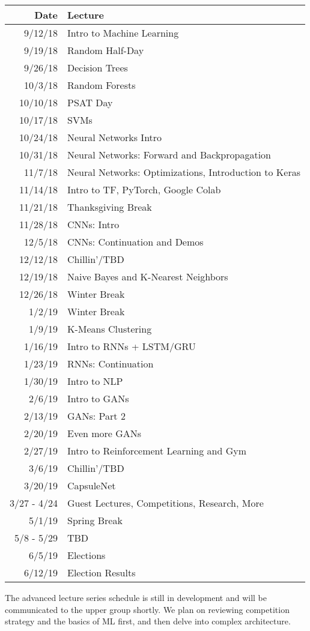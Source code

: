 \documentclass{article}
\begin{document}
\begin{tabular}{|r|l| }
  \hline
\textbf{Date} & \textbf{Lecture} \\
  \hline
9/12/18 & Intro to Machine Learning \\ 
9/19/18 & Random Half-Day \\ 
9/26/18 & Decision Trees \\ 
10/3/18 & Random Forests \\ 
10/10/18 & PSAT Day \\ 
10/17/18 & SVMs \\ 
10/24/18 & Neural Networks Intro \\ 
10/31/18 & Neural Networks: Forward and Backpropagation \\ 
11/7/18 & Neural Networks: Optimizations, Introduction to Keras \\ 
11/14/18 & Intro to TF, PyTorch, Google Colab \\ 
11/21/18 & Thanksgiving Break \\ 
11/28/18 & CNNs: Intro \\ 
12/5/18 & CNNs: Continuation and Demos \\ 
12/12/18 & Chillin'/TBD \\ 
12/19/18 & Naive Bayes and K-Nearest Neighbors \\ 
12/26/18 & Winter Break \\ 
1/2/19 & Winter Break \\ 
1/9/19 & K-Means Clustering \\ 
1/16/19 & Intro to RNNs + LSTM/GRU \\ 
1/23/19 & RNNs: Continuation \\ 
1/30/19 & Intro to NLP \\ 
2/6/19 & Intro to GANs \\ 
2/13/19 & GANs: Part 2 \\ 
2/20/19 & Even more GANs \\ 
2/27/19 & Intro to Reinforcement Learning and Gym \\ 
3/6/19 & Chillin'/TBD \\ 
3/20/19 & CapsuleNet \\ 
3/27 - 4/24 & Guest Lectures, Competitions, Research, More \\
5/1/19  & Spring Break \\ 
5/8 - 5/29 & TBD \\
6/5/19 & Elections \\
6/12/19 & Election Results \\
  \hline
\end{tabular}
\newline
The advanced lecture series schedule is still in development and will be communicated to the upper group shortly. We plan on reviewing competition strategy and the basics of ML first, and then delve into complex architecture.
\end{document}
